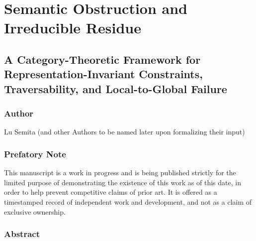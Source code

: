 \documentclass[
]{article}
\author{}
\date{}
\begin{document}
\section{Semantic Obstruction and Irreducible
Residue}\label{semantic-obstruction-and-irreducible-residue}

\subsection{A Category-Theoretic Framework for Representation-Invariant
Constraints, Traversability, and Local-to-Global
Failure}\label{a-category-theoretic-framework-for-representation-invariant-constraints-traversability-and-local-to-global-failure}

\subsubsection{Author}\label{author}

Lu Semita (and other Authors to be named later upon formalizing their
input)

\subsubsection{Prefatory Note}\label{prefatory-note}

This manuscript is a work in progress and is being published strictly
for the limited purpose of demonstrating the existence of this work as
of this date, in order to help prevent competitive claims of prior art.
It is offered as a timestamped record of independent work and
development, and not as a claim of exclusive ownership.

\subsubsection{Abstract}\label{abstract}
\end{document}
